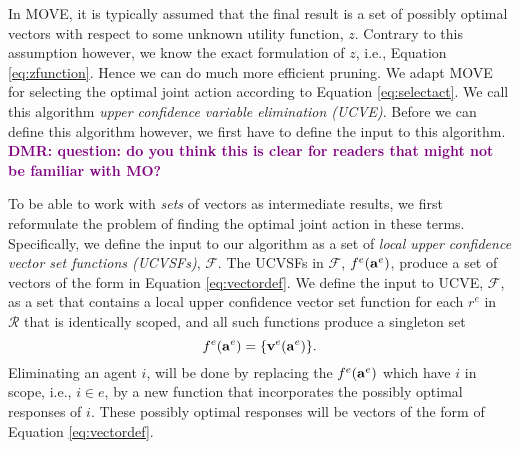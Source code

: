 \documentclass{article}
\newcommand{\dmr}[1]{\textcolor{purple}{\bf DMR: #1}}
\begin{document}
In MOVE, it is typically assumed that the final result is a set of possibly optimal vectors with respect to some unknown utility function, $z$. Contrary to this assumption however, we know the exact formulation of $z$, i.e., Equation \ref{eq:zfunction}. Hence we can do much more efficient pruning. We adapt MOVE for selecting the optimal joint action according to Equation \ref{eq:selectact}. We call this algorithm \emph{upper confidence variable elimination (UCVE)}. Before we can define this algorithm however, we first have to define the input to this algorithm. \dmr{question: do you think this is clear for readers that might not be familiar with MO?} 

To be able to work with \emph{sets} of vectors as intermediate results, we first reformulate the problem of finding the optimal joint action in these terms. Specifically, we define the input to our algorithm as a set of \emph{local upper confidence vector set functions (UCVSFs)}, $\mathcal{F}$. The UCVSFs in $\mathcal{F}$, $f^e({\bf a}^e)$, produce a set of vectors of the form in Equation \ref{eq:vectordef}. 
We define the input to UCVE, $\mathcal{F}$, as a set that contains a local upper confidence vector set function for each $r^e$ in $\mathcal{R}$ that is identically scoped, and all such functions produce a singleton set 
\[f^e({\bf a}^e) = \{ {\bf v}^e({\bf a}^e) \}.\]
Eliminating an agent $i$, will be done by replacing the $f^e({\bf a}^e)$ which have $i$ in scope, i.e., $i \in e$, by a new function that incorporates the possibly optimal responses of $i$. These possibly optimal responses will be vectors of the form of Equation \ref{eq:vectordef}.  
\end{document}
